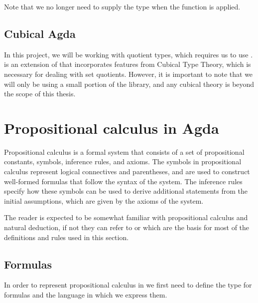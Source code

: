 \documentclass[titlepage]{article}
\begin{document}
Note that we no longer need to supply the type when the function is applied.


\subsection{Cubical Agda}

In this project, we will be working with quotient types, which requires us to use \CubicalAgda. \CubicalAgda is an extension of \Agda that incorporates features from Cubical Type Theory, which is necessary for dealing with set quotients.\cite{AgdaDoc} However, it is important to note that we will only be using a small portion of the \agdaCubical library, and any cubical theory is beyond the scope of this thesis.




\section{Propositional calculus in Agda}



Propositional calculus is a formal system that consists of a set of propositional constants, symbols, inference rules, and axioms. The symbols in propositional calculus represent logical connectives and parentheses, and are used to construct well-formed formulas that follow the syntax of the system. The inference rules specify how these symbols can be used to derive additional statements from the initial assumptions, which are given by the axioms of the system. 

The reader is expected to be somewhat familiar with propositional calculus and natural deduction, if not they can refer to \cite{carlstrom} or \cite{vanDalen} which are the basis for most of the definitions and rules used in this section.



\subsection{Formulas}

In order to represent propositional calculus in \Agda we first need to define the type for formulas and the language in which we express them.
\end{document}
